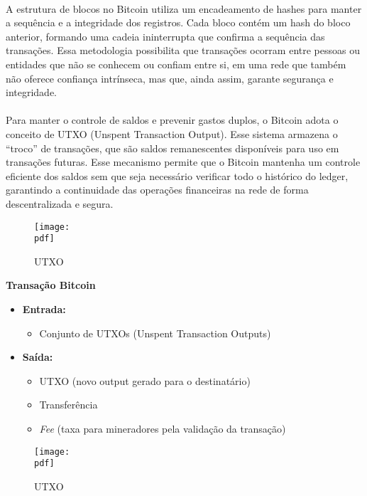 \documentclass[letterpaper,11pt,leqno]{article}
\newcommand{\pdf}{figures/figures}
\newcommand{\quotes}[1]{``#1''}
\begin{document}
\paragraph{}
A estrutura de blocos no Bitcoin utiliza um encadeamento de hashes para manter a
sequência e a integridade dos registros. Cada bloco contém um hash do bloco
anterior, formando uma cadeia ininterrupta que confirma a sequência das
transações. Essa metodologia possibilita que transações ocorram entre pessoas ou
entidades que não se conhecem ou confiam entre si, em uma rede que também não
oferece confiança intrínseca, mas que, ainda assim, garante segurança e
integridade.

\paragraph{}
Para manter o controle de saldos e prevenir gastos duplos, o Bitcoin adota o
conceito de UTXO (Unspent Transaction Output). Esse sistema armazena o
\quotes{troco} de transações, que são saldos remanescentes disponíveis para uso
em transações futuras. Esse mecanismo permite que o Bitcoin mantenha um controle
eficiente dos saldos sem que seja necessário verificar todo o histórico do
ledger, garantindo a continuidade das operações financeiras na rede de forma
descentralizada e segura.

\begin{figure}[H]
	{\texttt{[image: \\pdf]}}
	\caption{UTXO}
	\label{f:figure2}\end{figure}

\textbf{Transação Bitcoin}
\begin{itemize}
	\item \textbf{Entrada:}
	      \begin{itemize}
		      \item Conjunto de UTXOs (Unspent Transaction Outputs)
	      \end{itemize}
	\item \textbf{Saída:}
	      \begin{itemize}
		      \item UTXO (novo output gerado para o destinatário)
		      \item Transferência
		      \item \textit{Fee} (taxa para mineradores pela validação da transação)
	      \end{itemize}
\end{itemize}

\begin{figure}[H]
	{\texttt{[image: \\pdf]}}
	\caption{UTXO}
	\label{f:figure3}\end{figure}
\end{document}
